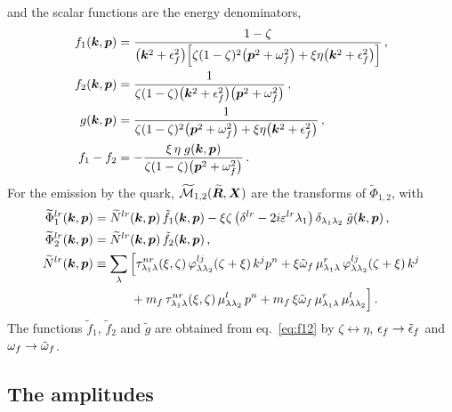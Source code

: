and the scalar functions are the energy denominators,
\begin{align}
f_1(\bm{k},\bm{p})&=\frac{1-\zeta}{\big(\bm{k}^2+\epsilon_f^2\big)\Big[\zeta(1-\zeta)^2\big(\bm{p}^2+\omega_f^2\big)+\xi\eta\big(\bm{k}^2+\epsilon_f^2\big)\Big]}\,,
\nonumber\\
f_2(\bm{k},\bm{p})&=\frac{1}{\zeta(1-\zeta)\big(\bm{k}^2+\epsilon_f^2\big)\big(\bm{p}^2+\omega_f^2\big)}\,,
\nonumber\\
g(\bm{k},\bm{p})&=\frac{1}{\zeta(1-\zeta)^2\big(\bm{p}^2+\omega_f^2\big)+\xi\eta\big(\bm{k}^2+\epsilon_f^2\big)}\,,
\nonumber\\
f_1-f_2&=-\frac{\xi\,\eta\;g(\bm{k},\bm{p})}{\zeta(1-\zeta)\big(\bm{p}^2+\omega_f^2\big)}\,.
\label{eq:f12}
\end{align}
For the emission by the quark, $\widetilde{\mathcal{M}}_{1,2}(\widetilde{\bm{R}},\bm{X})$ are the transforms of $\widetilde\Phi_{1,2}$, with
\begin{align}
\widetilde\Phi^{lr}_1(\bm{k},\bm{p})&=\widetilde N^{lr}(\bm{k},\bm{p})\,\tilde f_1(\bm{k},\bm{p})
-\xi\zeta\,\big(\delta^{lr}-2i\varepsilon^{lr}\lambda_1\big)\,\delta_{\lambda_1\lambda_2}\;\tilde g(\bm{k},\bm{p})\,,
\nonumber\\
\widetilde\Phi^{lr}_2(\bm{k},\bm{p})&=\widetilde N^{lr}(\bm{k},\bm{p})\,\tilde f_2(\bm{k},\bm{p})\,,
\nonumber\\
\widetilde N^{lr}(\bm{k},\bm{p})&\equiv\sum_\lambda\Big[\tau^{nr}_{\lambda_1\lambda}(\xi,\zeta)\,\varphi^{lj}_{\lambda\lambda_2}(\zeta+\xi)\,k^jp^n
+\xi\tilde{\omega}_f\,\mu^r_{\lambda_1\lambda}\,\varphi^{lj}_{\lambda\lambda_2}(\zeta+\xi)\,k^j
\nonumber\\
&\qquad\quad+m_f\,\tau^{nr}_{\lambda_1\lambda}(\xi,\zeta)\,\mu^l_{\lambda\lambda_2}\,p^n
+m_f\,\xi\tilde{\omega}_f\,\mu^r_{\lambda_1\lambda}\,\mu^l_{\lambda\lambda_2}\Big]\,.
\label{eq:Phit}
\end{align}
The functions $\tilde f_1$, $\tilde f_2$ and $\tilde g$ are obtained from eq.~\eqref{eq:f12} by
$\zeta\leftrightarrow\eta$, $\epsilon_f\to\tilde{\epsilon}_f$ and $\omega_f\to\tilde{\omega}_f$.

\subsection{The amplitudes}

